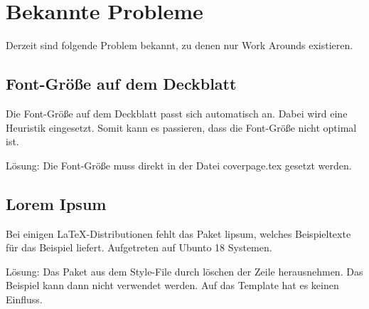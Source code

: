 %
\section{Bekannte Probleme}\label{sec:knownissues}
Derzeit sind folgende Problem bekannt, zu denen nur Work Arounds existieren.

\subsection{Font-Größe auf dem Deckblatt}
Die Font-Größe auf dem Deckblatt passt sich automatisch an. Dabei wird eine Heuristik eingesetzt. Somit kann es passieren, dass die Font-Größe nicht optimal ist. 

Lösung: Die Font-Größe muss direkt in der Datei coverpage.tex gesetzt werden.

\subsection{Lorem Ipsum}
Bei einigen \LaTeX -Distributionen fehlt das Paket lipsum, welches Beispieltexte für das Beispiel liefert. Aufgetreten auf  Ubunto 18 Systemen. 

Lösung: Das Paket aus dem Style-File durch löschen der Zeile herausnehmen. Das Beispiel kann dann nicht verwendet werden. Auf das Template hat es keinen Einfluss.